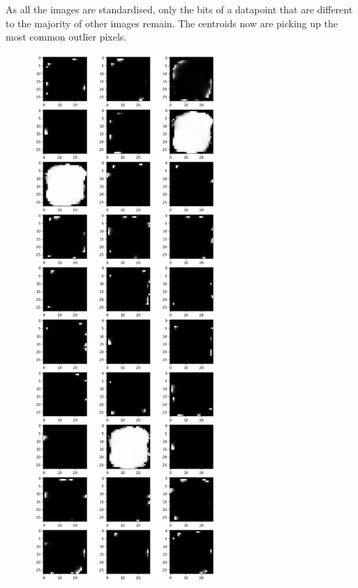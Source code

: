 \documentclass[submit]{harvardml}
\begin{document}
\begin{enumerate}
    As all the images are standardised, only the bits of a datapoint that are different to the majority of other images remain. The centroids now are picking up the most common outlier pixels.
    
    \begin{figure}[H]
        \includegraphics[height=20cm]{hw4/img/p2_4.png}
        \centering
    \end{figure}
    
    
    
\end{enumerate}
\end{document}
